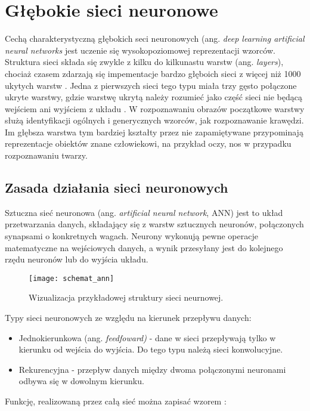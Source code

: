 \section{Głębokie sieci neuronowe}

Cechą charakterystyczną głębokich seci neuronowych (ang. \textit{deep learning artificial neural networks} jest uczenie się wysokopoziomowej reprezentacji wzorców. Struktura sieci składa się zwykle z kilku do kilkunastu warstw (ang. \textit{layers}), chociaż czasem zdarzają się impementacje bardzo głęboich sieci z więcej niż 1000 ukytych warstw \cite{He2015DeepRL}. Jedna z pierwszych sieci tego typu miała trzy gęsto połączone ukryte warstwy, gdzie warstwę ukrytą należy rozumieć jako część sieci nie będącą wejściem ani wyjściem z układu \cite{Hinton2006AFL}. W rozpoznawaniu obrazów początkowe warstwy służą identyfikacji ogólnych i generycznych wzorców, jak rozpoznawanie krawędzi. Im głębsza warstwa tym bardziej kształty przez nie zapamiętywane przypominają reprezentacje obiektów znane człowiekowi, na przykład oczy, nos w przypadku rozpoznawaniu twarzy.

\subsection{Zasada działania sieci neuronowych}
Sztuczna sieć neuronowa (ang. \textit{artificial neural network}, ANN) jest to układ przetwarzania danych, składający się z warstw sztucznych neuronów, połączonych synapsami o konkretnych wagach. Neurony wykonują pewne operacje matematyczne na wejściowych danych, a wynik przesyłany jest do kolejnego rzędu neuronów lub do wyjścia układu. 

\begin{figure}[h]
	\centering
	\centering
		\texttt{[image: schemat\_ann]}	
	\caption{Wizualizacja przykładowej struktury sieci neurnowej.}
\end{figure}

Typy sieci neuronowych ze względu na kierunek przepływu danych:
\begin{itemize}
\item{Jednokierunkowa (ang. \textit{feedfoward)} - dane w sieci przepływają tylko w kierunku od wejścia do wyjścia. Do tego typu należą sieci konwolucyjne.}
\item{Rekurencyjna - przepływ danych między dwoma połączonymi neuronami odbywa się w dowolnym kierunku.}
\end{itemize}

Funkcję, realizowaną przez całą sieć można zapisać wzorem \cite{tadeusiewicz_sn}:

